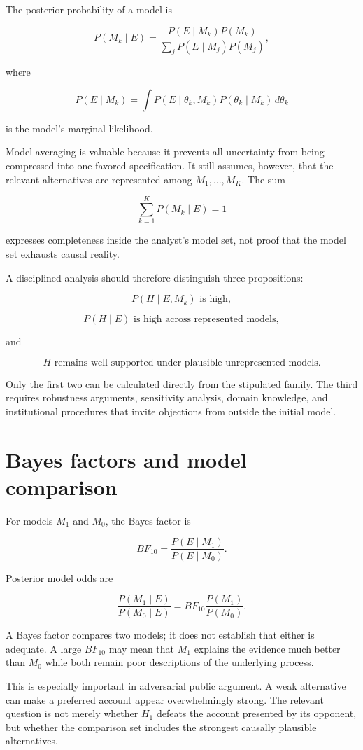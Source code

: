 The posterior probability of a model is

\[
P(M_k\mid E)
=
\frac{P(E\mid M_k)P(M_k)}
{\sum_jP(E\mid M_j)P(M_j)},
\]

where

\[
P(E\mid M_k)
=
\int
P(E\mid\theta_k,M_k)
P(\theta_k\mid M_k)
\,d\theta_k
\]

is the model's marginal likelihood.

Model averaging is valuable because it prevents all uncertainty from being compressed into one favored specification. It still assumes, however, that the relevant alternatives are represented among \(M_1,\ldots,M_K\). The sum

\[
\sum_{k=1}^{K}P(M_k\mid E)=1
\]

expresses completeness inside the analyst's model set, not proof that the model set exhausts causal reality.

A disciplined analysis should therefore distinguish three propositions:

\[
P(H\mid E,M_k)\text{ is high},
\]

\[
P(H\mid E)\text{ is high across represented models},
\]

and

\[
H\text{ remains well supported under plausible unrepresented models}.
\]

Only the first two can be calculated directly from the stipulated family. The third requires robustness arguments, sensitivity analysis, domain knowledge, and institutional procedures that invite objections from outside the initial model.

\section{Bayes factors and model comparison}
\label{sec:a16}

For models \(M_1\) and \(M_0\), the Bayes factor is

\[
BF_{10}
=
\frac{P(E\mid M_1)}
{P(E\mid M_0)}.
\]

Posterior model odds are

\[
\frac{P(M_1\mid E)}
{P(M_0\mid E)}
=
BF_{10}
\frac{P(M_1)}
{P(M_0)}.
\]

A Bayes factor compares two models; it does not establish that either is adequate. A large \(BF_{10}\) may mean that \(M_1\) explains the evidence much better than \(M_0\) while both remain poor descriptions of the underlying process.

This is especially important in adversarial public argument. A weak alternative can make a preferred account appear overwhelmingly strong. The relevant question is not merely whether \(H_1\) defeats the account presented by its opponent, but whether the comparison set includes the strongest causally plausible alternatives.


